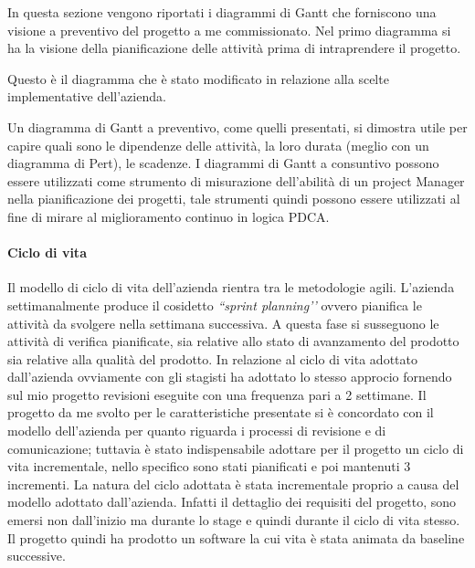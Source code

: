 In questa sezione vengono riportati i diagrammi di Gantt che forniscono una visione a preventivo del progetto a me commissionato. Nel primo diagramma si ha la visione della pianificazione delle attivit\`{a} prima di intraprendere il progetto.

Questo \`{e} il diagramma che \`{e} stato modificato in relazione alla scelte implementative dell\textquoteright{}azienda.

Un diagramma di Gantt a preventivo, come quelli presentati, si dimostra utile per capire quali sono le dipendenze delle attivit\`{a}, la loro durata (meglio con un diagramma di Pert), le scadenze. I diagrammi di Gantt a consuntivo possono essere utilizzati come strumento di misurazione dell\textquoteright{}abilit\`{a} di un project Manager nella pianificazione dei progetti, tale strumenti quindi possono essere utilizzati al fine di mirare al miglioramento continuo in logica PDCA.

\paragraph{Ciclo di vita}
Il modello di ciclo di vita dell\textquoteright{}azienda rientra tra le metodologie agili. L\textquoteright{}azienda settimanalmente produce il cosidetto \textit{``sprint planning\textquoteright{}\textquoteright{}} ovvero pianifica le attivit\`{a} da svolgere nella settimana successiva. A questa fase si susseguono le attivit\`{a} di verifica pianificate, sia relative allo stato di avanzamento del prodotto sia relative alla qualit\`{a} del prodotto. In relazione al ciclo di vita adottato dall\textquoteright{}azienda ovviamente con gli stagisti ha adottato lo stesso approcio fornendo sul mio progetto revisioni eseguite con una frequenza pari a 2 settimane. Il progetto da me svolto per le caratteristiche presentate si \`{e} concordato con il modello dell\textquoteright{}azienda per quanto riguarda i processi di revisione e di comunicazione; tuttavia \`{e} stato indispensabile adottare per il progetto un ciclo di vita incrementale, nello specifico sono stati pianificati e poi mantenuti 3 incrementi. La natura del ciclo adottata \`{e} stata incrementale proprio a causa del modello adottato dall\textquoteright{}azienda. Infatti il dettaglio dei requisiti del progetto, sono emersi non dall\textquoteright{}inizio ma durante lo stage e quindi durante il ciclo di vita stesso. Il progetto quindi ha prodotto un software la cui vita \`{e} stata animata da baseline successive.
